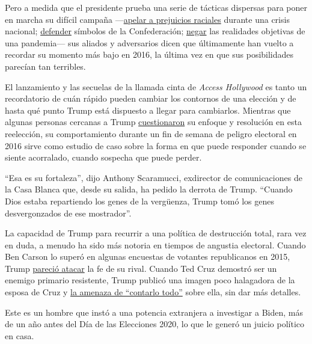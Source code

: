 Pero a medida que el presidente prueba una serie de tácticas dispersas
para poner en marcha su difícil campaña
---\href{https://www.nytimes.com/2020/06/11/us/politics/trump-on-race.html}{apelar
a prejuicios raciales} durante una crisis nacional;
\href{https://www.nytimes.com/2020/07/06/us/politics/trump-bubba-wallace-nascar.html}{defender}
símbolos de la Confederación;
\href{https://www.nytimes.com/2020/06/21/health/coronavirus-pandemic-spread-trump.html}{negar}
las realidades objetivas de una pandemia--- sus aliados y adversarios
dicen que últimamente han vuelto a recordar su momento más bajo en 2016,
la última vez en que sus posibilidades parecían tan terribles.

El lanzamiento y las secuelas de la llamada cinta de \emph{Access
Hollywood} es tanto un recordatorio de cuán rápido pueden cambiar los
contornos de una elección y de hasta qué punto Trump está dispuesto a
llegar para cambiarlos. Mientras que algunas personas cercanas a Trump
\href{https://www.nytimes.com/es/2020/06/20/espanol/trump-elecciones-2020.html}{cuestionaron}
su enfoque y resolución en esta reelección, su comportamiento durante un
fin de semana de peligro electoral en 2016 sirve como estudio de caso
sobre la forma en que puede responder cuando se siente acorralado,
cuando sospecha que puede perder.

``Esa es su fortaleza'', dijo Anthony Scaramucci, exdirector de
comunicaciones de la Casa Blanca que, desde su salida, ha pedido la
derrota de Trump. ``Cuando Dios estaba repartiendo los genes de la
vergüenza, Trump tomó los genes desvergonzados de ese mostrador''.

La capacidad de Trump para recurrir a una política de destrucción total,
rara vez en duda, a menudo ha sido más notoria en tiempos de angustia
electoral. Cuando Ben Carson lo superó en algunas encuestas de votantes
republicanos en 2015, Trump
\href{https://www.nytimes.com/politics/first-draft/2015/10/25/donald-trump-attacks-ben-carson-and-highlights-his-religion}{pareció
atacar} la fe de su rival. Cuando Ted Cruz demostró ser un enemigo
primario resistente, Trump publicó una imagen poco halagadora de la
esposa de Cruz y
\href{https://www.nytimes.com/politics/first-draft/2016/03/23/donald-trump-threatens-ted-cruzs-wife-elicting-angry-retort/}{la
amenaza de ``contarlo todo''} sobre ella, sin dar más detalles.

Este es un hombre que instó a una potencia extranjera a investigar a
Biden, más de un año antes del Día de las Elecciones 2020, lo que le
generó un juicio político en casa.

